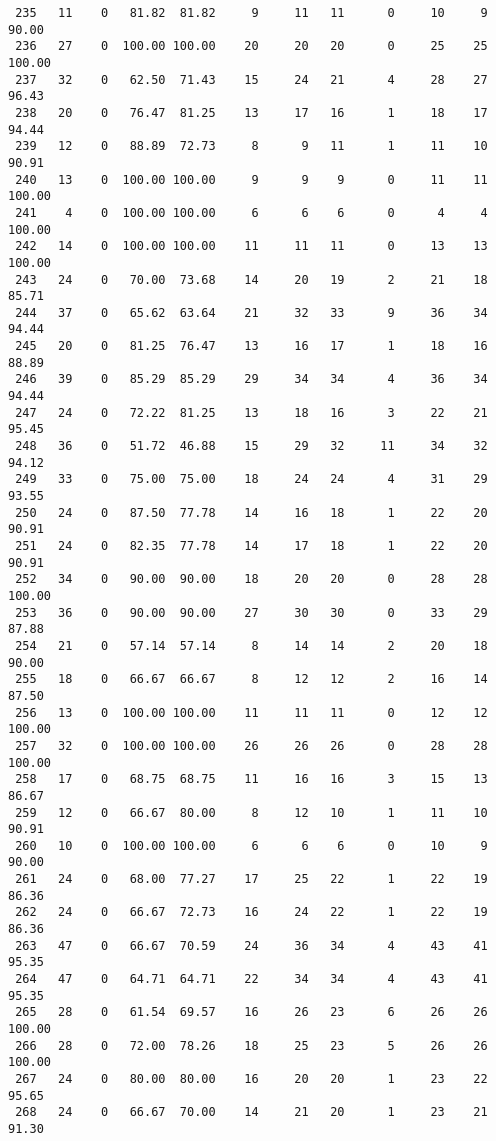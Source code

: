 \begin{verbatim}
 235   11    0   81.82  81.82     9     11   11      0     10     9    90.00
 236   27    0  100.00 100.00    20     20   20      0     25    25   100.00
 237   32    0   62.50  71.43    15     24   21      4     28    27    96.43
 238   20    0   76.47  81.25    13     17   16      1     18    17    94.44
 239   12    0   88.89  72.73     8      9   11      1     11    10    90.91
 240   13    0  100.00 100.00     9      9    9      0     11    11   100.00
 241    4    0  100.00 100.00     6      6    6      0      4     4   100.00
 242   14    0  100.00 100.00    11     11   11      0     13    13   100.00
 243   24    0   70.00  73.68    14     20   19      2     21    18    85.71
 244   37    0   65.62  63.64    21     32   33      9     36    34    94.44
 245   20    0   81.25  76.47    13     16   17      1     18    16    88.89
 246   39    0   85.29  85.29    29     34   34      4     36    34    94.44
 247   24    0   72.22  81.25    13     18   16      3     22    21    95.45
 248   36    0   51.72  46.88    15     29   32     11     34    32    94.12
 249   33    0   75.00  75.00    18     24   24      4     31    29    93.55
 250   24    0   87.50  77.78    14     16   18      1     22    20    90.91
 251   24    0   82.35  77.78    14     17   18      1     22    20    90.91
 252   34    0   90.00  90.00    18     20   20      0     28    28   100.00
 253   36    0   90.00  90.00    27     30   30      0     33    29    87.88
 254   21    0   57.14  57.14     8     14   14      2     20    18    90.00
 255   18    0   66.67  66.67     8     12   12      2     16    14    87.50
 256   13    0  100.00 100.00    11     11   11      0     12    12   100.00
 257   32    0  100.00 100.00    26     26   26      0     28    28   100.00
 258   17    0   68.75  68.75    11     16   16      3     15    13    86.67
 259   12    0   66.67  80.00     8     12   10      1     11    10    90.91
 260   10    0  100.00 100.00     6      6    6      0     10     9    90.00
 261   24    0   68.00  77.27    17     25   22      1     22    19    86.36
 262   24    0   66.67  72.73    16     24   22      1     22    19    86.36
 263   47    0   66.67  70.59    24     36   34      4     43    41    95.35
 264   47    0   64.71  64.71    22     34   34      4     43    41    95.35
 265   28    0   61.54  69.57    16     26   23      6     26    26   100.00
 266   28    0   72.00  78.26    18     25   23      5     26    26   100.00
 267   24    0   80.00  80.00    16     20   20      1     23    22    95.65
 268   24    0   66.67  70.00    14     21   20      1     23    21    91.30

\end{verbatim}
